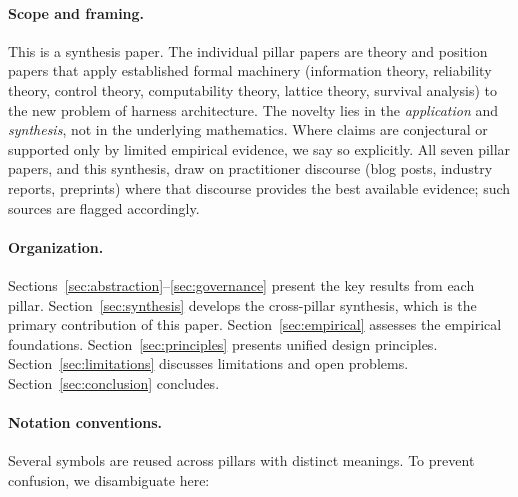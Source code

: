 \documentclass[11pt, a4paper, logo, copyright]{googledeepmind}
\begin{document}
\paragraph{Scope and framing.} This is a synthesis paper. The individual pillar papers are theory and position papers that apply established formal machinery (information theory, reliability theory, control theory, computability theory, lattice theory, survival analysis) to the new problem of harness architecture. The novelty lies in the \emph{application} and \emph{synthesis}, not in the underlying mathematics. Where claims are conjectural or supported only by limited empirical evidence, we say so explicitly. All seven pillar papers, and this synthesis, draw on practitioner discourse (blog posts, industry reports, preprints) where that discourse provides the best available evidence; such sources are flagged accordingly.

\paragraph{Organization.} Sections~\ref{sec:abstraction}--\ref{sec:governance} present the key results from each pillar. Section~\ref{sec:synthesis} develops the cross-pillar synthesis, which is the primary contribution of this paper. Section~\ref{sec:empirical} assesses the empirical foundations. Section~\ref{sec:principles} presents unified design principles. Section~\ref{sec:limitations} discusses limitations and open problems. Section~\ref{sec:conclusion} concludes.

\paragraph{Notation conventions.} Several symbols are reused across pillars with distinct meanings. To prevent confusion, we disambiguate here:
\end{document}
